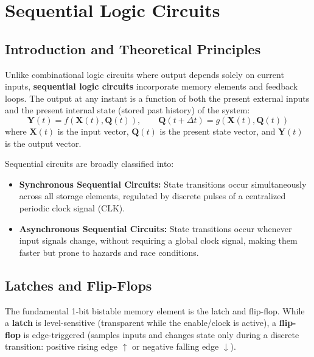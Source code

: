 \chapter{Sequential Logic Circuits}
\label{chap:sequential-logic}

\section{Introduction and Theoretical Principles}
Unlike combinational logic circuits where output depends solely on current inputs, \textbf{sequential logic circuits} incorporate memory elements and feedback loops. The output at any instant is a function of both the present external inputs and the present internal state (stored past history) of the system:
\begin{equation}
\mathbf{Y}(t) = f(\mathbf{X}(t), \mathbf{Q}(t)), \qquad \mathbf{Q}(t+\Delta t) = g(\mathbf{X}(t), \mathbf{Q}(t))
\end{equation}
where $\mathbf{X}(t)$ is the input vector, $\mathbf{Q}(t)$ is the present state vector, and $\mathbf{Y}(t)$ is the output vector.

Sequential circuits are broadly classified into:
\begin{itemize}
    \item \textbf{Synchronous Sequential Circuits:} State transitions occur simultaneously across all storage elements, regulated by discrete pulses of a centralized periodic clock signal ($\text{CLK}$).
    \item \textbf{Asynchronous Sequential Circuits:} State transitions occur whenever input signals change, without requiring a global clock signal, making them faster but prone to hazards and race conditions.
\end{itemize}

\section{Latches and Flip-Flops}
The fundamental 1-bit bistable memory element is the latch and flip-flop. While a \textbf{latch} is level-sensitive (transparent while the enable/clock is active), a \textbf{flip-flop} is edge-triggered (samples inputs and changes state only during a discrete transition: positive rising edge $\uparrow$ or negative falling edge $\downarrow$).

